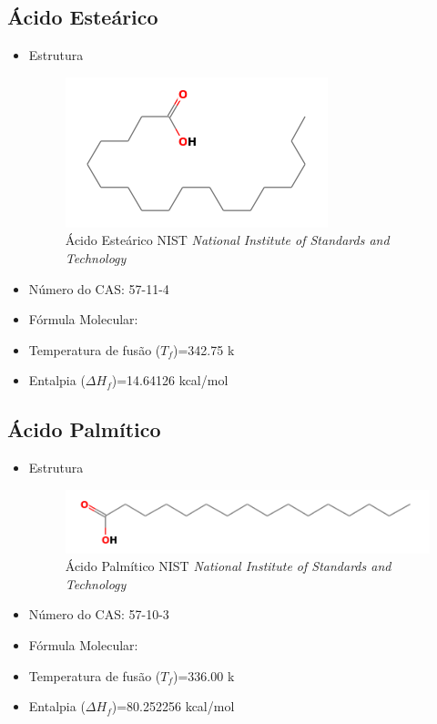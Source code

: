 	\subsection{Ácido Esteárico}
	\label{sec:2}
	\begin{itemize}
		\item Estrutura
		\begin{figure}[H]
			\centering
			\includegraphics[width=0.7\linewidth]{dados/figuras/Ac_estearico.png}
			\caption[Ácido Esteárico]{Ácido Esteárico NIST \textit{National Institute of Standards and Technology}}
			\label{fig:nist2}
		\end{figure}
		\item Número do CAS: 57-11-4
		\item Fórmula Molecular: 
		\item Temperatura de fusão ($T_f$)=342.75 k
		\item Entalpia ($\Delta H_{f}$)=14.64126 kcal/mol
	\end{itemize}
	
	\subsection{Ácido Palmítico}
	\label{sec:3}
	\begin{itemize}
		\item Estrutura
		\begin{figure}[H]
			\centering
			\includegraphics[width=0.65\linewidth]{dados/figuras/Ac_palmitico.png}
			\caption[Ácido Palmítico]{Ácido Palmítico NIST \textit{National Institute of Standards and Technology}}
			\label{fig:nist3}
		\end{figure}
		\item Número do CAS: 57-10-3
		\item Fórmula Molecular: 
		\item Temperatura de fusão ($T_f$)=336.00 k
		\item Entalpia ($\Delta H_{f}$)=80.252256 kcal/mol
	\end{itemize}
	
